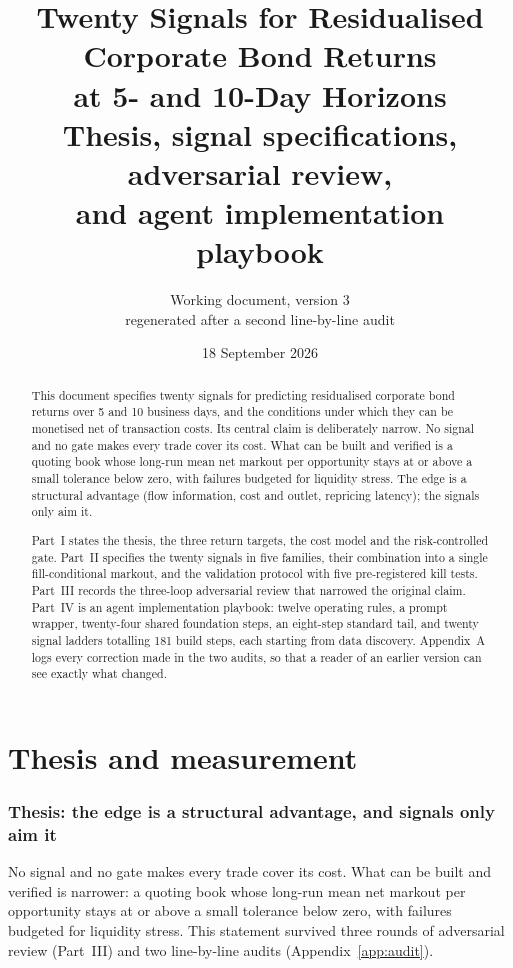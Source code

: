 \documentclass[11pt,letterpaper]{article}
\title{\textbf{Twenty Signals for Residualised Corporate Bond Returns\\ at 5- and 10-Day Horizons}\\[6pt]
\large Thesis, signal specifications, adversarial review,\\ and agent implementation playbook}
\author{Working document, version 3\\ \small regenerated after a second line-by-line audit}
\date{18 September 2026}
\begin{document}
\maketitle
\thispagestyle{fancy}

\begin{abstract}
\noindent
This document specifies twenty signals for predicting residualised corporate bond returns over 5 and 10 business days, and the conditions under which they can be monetised net of transaction costs. Its central claim is deliberately narrow. No signal and no gate makes every trade cover its cost. What can be built and verified is a quoting book whose long-run mean net markout per opportunity stays at or above a small tolerance below zero, with failures budgeted for liquidity stress. The edge is a structural advantage (flow information, cost and outlet, repricing latency); the signals only aim it.

Part~I states the thesis, the three return targets, the cost model and the risk-controlled gate. Part~II specifies the twenty signals in five families, their combination into a single fill-conditional markout, and the validation protocol with five pre-registered kill tests. Part~III records the three-loop adversarial review that narrowed the original claim. Part~IV is an agent implementation playbook: twelve operating rules, a prompt wrapper, twenty-four shared foundation steps, an eight-step standard tail, and twenty signal ladders totalling 181 build steps, each starting from data discovery. Appendix~A logs every correction made in the two audits, so that a reader of an earlier version can see exactly what changed.
\end{abstract}

\tableofcontents
\newpage
\part{Thesis and measurement}

\section{Thesis: the edge is a structural advantage, and signals only aim it}
\label{sec:thesis}

No signal and no gate makes every trade cover its cost. What can be built and verified is narrower: a quoting book whose long-run mean net markout per opportunity stays at or above a small tolerance below zero, with failures budgeted for liquidity stress. This statement survived three rounds of adversarial review (Part~III) and two line-by-line audits (Appendix~\ref{app:audit}).
\end{document}
